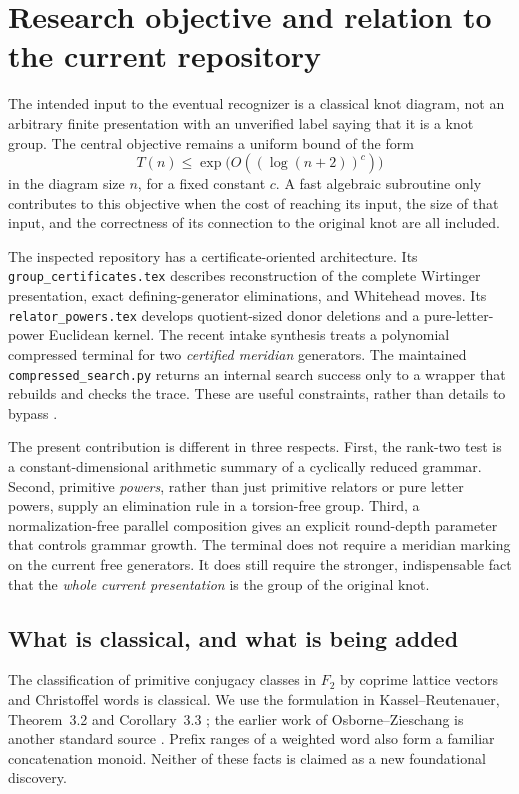 \documentclass[11pt,letterpaper]{article}
\theoremstyle{definition}
\begin{document}
\section{Research objective and relation to the current repository}
\label{sec:scope}
The intended input to the eventual recognizer is a classical knot diagram,
not an arbitrary finite presentation with an unverified label saying that it
is a knot group. The central objective remains a uniform bound of the form
\[
 T(n)\leq \exp\bigl(O((\log(n+2))^c)\bigr)
\]
in the diagram size $n$, for a fixed constant $c$. A fast algebraic subroutine
only contributes to this objective when the cost of reaching its input, the
size of that input, and the correctness of its connection to the original
knot are all included.

The inspected repository has a certificate-oriented architecture. Its
\texttt{group\_certificates.tex} describes reconstruction of the complete
Wirtinger presentation, exact defining-generator eliminations, and Whitehead
moves. Its \texttt{relator\_powers.tex} develops quotient-sized donor deletions
and a pure-letter-power Euclidean kernel. The recent intake synthesis treats
a polynomial compressed terminal for two \emph{certified meridian} generators.
The maintained \texttt{compressed\_search.py} returns an internal search
success only to a wrapper that rebuilds and checks the trace. These are useful
constraints, rather than details to bypass \cite{RepoGroup,RepoPowers,RepoIntake,RepoSearch}.

The present contribution is different in three respects. First, the
rank-two test is a constant-dimensional arithmetic summary of a cyclically
reduced grammar. Second, primitive \emph{powers}, rather than just primitive
relators or pure letter powers, supply an elimination rule in a torsion-free
group. Third, a normalization-free parallel composition gives an explicit
round-depth parameter that controls grammar growth. The terminal does not
require a meridian marking on the current free generators. It does still
require the stronger, indispensable fact that the \emph{whole current
presentation} is the group of the original knot.

\subsection{What is classical, and what is being added}
The classification of primitive conjugacy classes in $F_2$ by coprime lattice
vectors and Christoffel words is classical. We use the formulation in
Kassel--Reutenauer, Theorem~3.2 and Corollary~3.3 \cite{KR}; the earlier work of
Osborne--Zieschang is another standard source \cite{OZ}. Prefix ranges of a
weighted word also form a familiar concatenation monoid. Neither of these
facts is claimed as a new foundational discovery.
\end{document}
